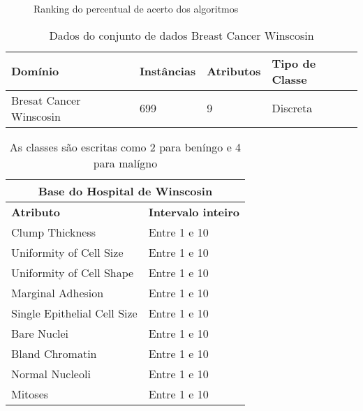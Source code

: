 \begin{figure}
\caption{Ranking do percentual de acerto dos algoritmos}
\label{figure:ranking}
\end{figure}

\begin{table}[h]
  \begin{center}
    \begin{tabular}{ l | l | l | l}
      \hline
      Domínio & Instâncias & Atributos & Tipo de Classe \\ \hline
      Bresat Cancer Winscosin & 699 & 9 & Discreta \\ \hline
    \end{tabular}
    \caption[Dados do domínio]{Dados do conjunto de dados Breast Cancer Winscosin\cite{donator:92}}
    \label{table:dataset}
  \end{center}
\end{table}

\begin{table}
  \begin{center}
    \begin{tabular}{ l | l }
      \hline
      \multicolumn{2}{c}{ \bfseries Base do Hospital de Winscosin} \\ \hline
      \bfseries Atributo & \bfseries Intervalo inteiro\\ \hline
      Clump Thickness & Entre 1 e 10 \\
      Uniformity of Cell Size & Entre 1 e 10 \\
      Uniformity of Cell Shape & Entre 1 e 10 \\
      Marginal Adhesion & Entre 1 e 10 \\
      Single Epithelial Cell Size & Entre 1 e 10 \\
      Bare Nuclei & Entre 1 e 10 \\
      Bland Chromatin & Entre 1 e 10 \\
      Normal Nucleoli & Entre 1 e 10 \\
      Mitoses & Entre 1 e 10 \\
      \hline
    \end{tabular}
  \end{center}
  \caption{ As classes são escritas como 2 para beníngo e 4 para malígno}
  \label{table:disposicao-atributos}
\end{table}

